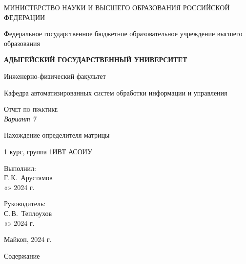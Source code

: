 \documentclass[12pt,a4paper]{scrartcl}
\begin{document}
	\begin{titlepage}
		\begin{center}
			\large
			МИНИСТЕРСТВО НАУКИ И ВЫСШЕГО ОБРАЗОВАНИЯ РОССИЙСКОЙ ФЕДЕРАЦИИ
			
			Федеральное государственное бюджетное образовательное учреждение высшего образования
			
			\textbf{АДЫГЕЙСКИЙ ГОСУДАРСТВЕННЫЙ УНИВЕРСИТЕТ}
			\vspace{0.25cm}
			
			Инженерно-физический факультет
			
			Кафедра автоматизированных систем обработки информации и управления
			\vfill

			\vfill
			
			\textsc{Отчет по практике}\\[5mm]
			
			\LARGE\textit{Вариант 7}
			
			{\LARGE Нахождение определителя матрицы}
			\bigskip
			
			1 курс, группа 1ИВТ АСОИУ
		\end{center}
		\vfill
		
		\newlength{\ML}
		\hfill\begin{minipage}{0.5\textwidth}
			Выполнил:\\
			\underline{\hspace{\ML}} Г.\,К.~Арустамов\\
			«\underline{\hspace{0.7cm}}» \underline{\hspace{2cm}} 2024 г.
		\end{minipage}%
		\bigskip
		
		\hfill\begin{minipage}{0.5\textwidth}
			Руководитель:\\
			\underline{\hspace{\ML}} С.\,В.~Теплоухов\\
			«\underline{\hspace{0.7cm}}» \underline{\hspace{2cm}} 2024 г.
		\end{minipage}%
		
		
		\vfill
		
		
		
		\begin{center}
			
			Майкоп, 2024 г.
		\end{center}
	\end{titlepage}
\LARGE{Содержание}
\end{document}
